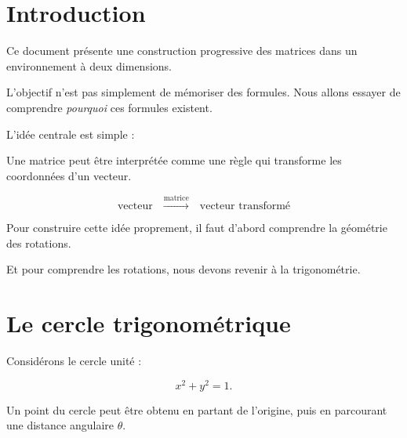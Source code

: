 \documentclass[11pt,a4paper]{article}
\newcommand{\sectiontitle}[1]{
    \section{#1}
}
\begin{document}
\newpage


\sectiontitle{Introduction}

Ce document présente une construction progressive des matrices
dans un environnement à deux dimensions.

L'objectif n'est pas simplement de mémoriser des formules.
Nous allons essayer de comprendre \emph{pourquoi} ces formules
existent.

L'idée centrale est simple :

\begin{definitionbox}

Une matrice peut être interprétée comme une règle qui transforme
les coordonnées d'un vecteur.

\[
\boxed{
\text{vecteur}
\quad\xrightarrow{\text{matrice}}\quad
\text{vecteur transformé}
}
\]

\end{definitionbox}

Pour construire cette idée proprement, il faut d'abord comprendre
la géométrie des rotations.

Et pour comprendre les rotations, nous devons revenir à la
trigonométrie.


\sectiontitle{Le cercle trigonométrique}

Considérons le cercle unité :

\[
x^2+y^2=1.
\]

Un point du cercle peut être obtenu en partant de l'origine,
puis en parcourant une distance angulaire $\theta$.

\end{document}
